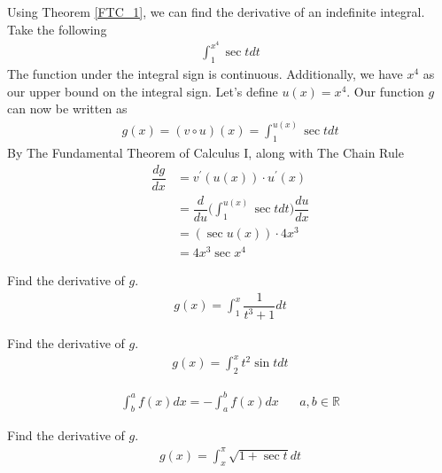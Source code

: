 \begin{example}
Using Theorem \ref{FTC_1}, we can find the derivative of an indefinite integral. Take the following
\begin{align*}
    \int_{1}^{x^{4}} \sec t dt
\end{align*}
The function under the integral sign is continuous. Additionally, we have $x^{4}$ as our upper bound on the integral sign. Let's define $u(x) = x^{4}$. Our function $g$ can now be written as 
\begin{align*}
    g(x) = (v \circ u)(x) = \int_{1}^{u(x)} \sec t dt
\end{align*}
By The Fundamental Theorem of Calculus I, along with The Chain Rule 
\begin{align*}
    \dfrac{dg}{dx} &= v^{'}(u(x)) \cdot u^{'}(x)\\[2ex] 
    &= \dfrac{d}{du} \Big( \int_{1}^{u(x)} \sec t dt \Big) \dfrac{du}{dx}\\[2ex]
    &= ( \sec u(x) ) \cdot 4x^{3}\\[2ex]
    &= 4x^{3} \sec x^{4} 
\end{align*}
\end{example}

\begin{exercise}
Find the derivative of $g$.
\begin{align*}
    g(x) = \int_{1}^{x} \dfrac{1}{t^{3} + 1} dt
\end{align*}
\end{exercise}

\begin{exercise}
Find the derivative of $g$.
\begin{align*}
    g(x) = \int_{2}^{x} t^{2} \sin t dt
\end{align*}
\end{exercise}

\begin{note}
\begin{align*}
    \int_{b}^{a} f(x) dx = -\int_{a}^{b} f(x) dx \hspace{20pt} a, b \in \mathbb{R}
\end{align*}
\end{note}

\begin{exercise}
Find the derivative of $g$.
\begin{align*}
    g(x) = \int_{x}^{\pi} \sqrt{1 + \sec t} dt
\end{align*}
\end{exercise}

